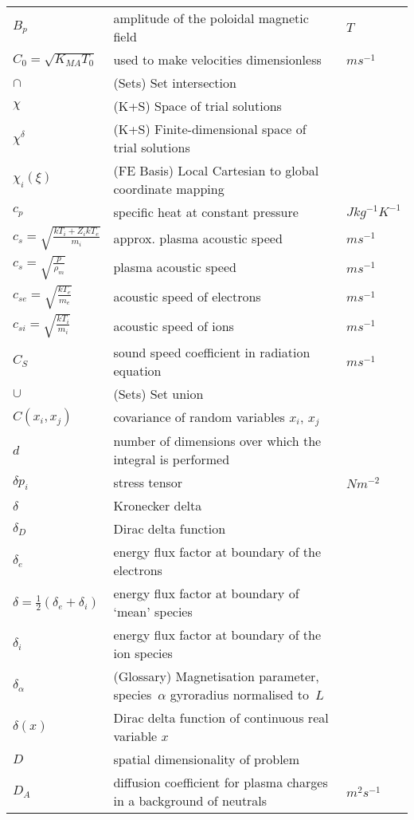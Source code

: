 \begin{longtable}{|p{3.0cm}|p{10.0cm}|p{3.0cm}|}
$B_p$ & amplitude of the poloidal magnetic field  &  $T$  \\
$C_0=\sqrt{K_{MA} T_0}$ & used to make velocities dimensionless  &  $m s^{-1}$ \\
$\cap$ &  (Sets) Set intersection & \\
$\chi$ &  (K+S) Space of trial solutions & \\
$\chi^{\delta}$ &  (K+S) Finite-dimensional space of trial solutions & \\
$\chi_i(\xi)$ &  (FE Basis) Local Cartesian to global coordinate mapping & \\
$c_p$ & specific heat at constant pressure  &  $J kg^{-1} K^{-1}$ \\
$c_s = \sqrt{\frac{kT_i + {Z_i} kT_e}{{m_i}}}$ & approx. plasma acoustic speed  &  $m s^{-1}$ \\
$c_s = \sqrt{\frac{p}{\rho_m}}$ & plasma acoustic speed  &  $m s^{-1}$ \\
$c_{se} = \sqrt{\frac{kT_e}{{m_e}}}$ & acoustic speed of electrons  &  $m s^{-1}$ \\
$c_{si} = \sqrt{\frac{kT_i}{{m_i}}}$ & acoustic speed of ions  &  $m s^{-1}$ \\
$C_S$ & sound speed coefficient in radiation equation  &  $m s^{-1}$ \\
$\cup$ &  (Sets) Set union & \\
$C(x_i, x_j)$ & covariance of random variables $x_i$, $x_j$  & \\
$d$ & number of dimensions over which the integral is performed  & \\
$\delta p_i$ & stress tensor  & $N m^{-2}$ \\
$\delta$ & Kronecker delta & \\
$\delta_D$ & Dirac delta function & \\
$\delta_e$ & energy flux factor at boundary of the electrons  & \\
$\delta=\frac{1}{2}(\delta_e+\delta_i)$ & energy flux factor at boundary of `mean' species  & \\
$\delta_i$ & energy flux factor at boundary of the ion species  & \\
$\delta_\alpha$ & (Glossary) Magnetisation  parameter, species~$\alpha$  gyroradius normalised to~$L$ & \\
$\delta(x)$ & Dirac delta function of continuous real variable $x$  & \\
$D$ & spatial dimensionality of problem &   \\
$D_A$ & diffusion coefficient for plasma charges in a background of neutrals  &  $m^2 s^{-1}$ \\

\end{longtable}
